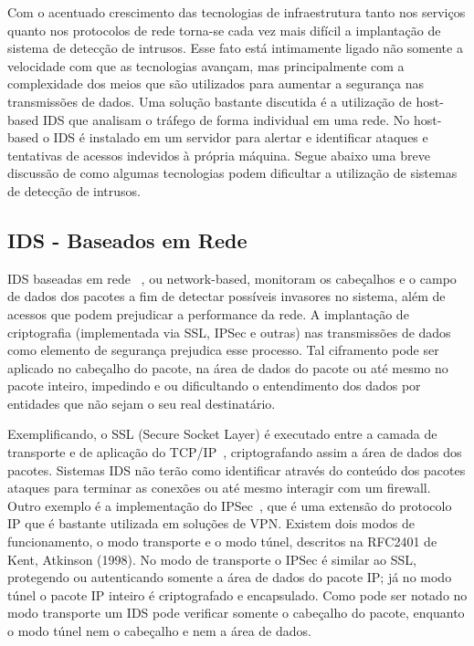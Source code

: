 Com o acentuado crescimento das tecnologias de infraestrutura tanto nos serviços quanto nos protocolos de rede torna-se cada vez mais difícil a implantação de sistema de detecção de intrusos. Esse fato está intimamente ligado não somente a velocidade com que as tecnologias avançam, mas principalmente com a complexidade dos meios que são utilizados para aumentar a segurança nas transmissões de dados.
Uma solução bastante discutida é a utilização de host-based IDS que analisam o tráfego de forma individual em uma rede. No host-based o IDS é instalado em um servidor para alertar e identificar ataques e tentativas de acessos indevidos à própria máquina.
Segue abaixo uma breve discussão de como algumas tecnologias podem dificultar a utilização de sistemas de detecção de intrusos.

\subsection{IDS - Baseados em Rede}
IDS baseadas em rede ~\cite{tanenbaum}, ou network-based, monitoram os cabeçalhos e o campo de dados dos pacotes a fim de detectar possíveis invasores no sistema, além de acessos que podem prejudicar a performance da rede. A implantação de criptografia (implementada via SSL, IPSec e outras) nas transmissões de dados como elemento de segurança prejudica esse processo. Tal ciframento pode ser aplicado no cabeçalho do pacote, na área de dados do pacote ou até mesmo no pacote inteiro, impedindo e ou dificultando o entendimento dos dados por entidades que não sejam o seu real destinatário.

Exemplificando, o SSL (Secure Socket Layer) é executado entre a camada de transporte e de aplicação do TCP/IP~\cite{carmona}, criptografando assim a área de dados dos pacotes. Sistemas IDS não terão como identificar através do conteúdo dos pacotes ataques para terminar as conexões ou até mesmo interagir com um firewall.
Outro exemplo é a implementação do IPSec~\cite{eriberto}, que é uma extensão do protocolo IP que é bastante utilizada em soluções de VPN. Existem dois modos de funcionamento, o modo transporte e o modo túnel, descritos na RFC2401 de Kent, Atkinson (1998).
No modo de transporte o IPSec é similar ao SSL, protegendo ou autenticando somente a área de dados do pacote IP; já no modo túnel o pacote IP inteiro é criptografado e encapsulado. Como pode ser notado no modo transporte um IDS pode verificar somente o cabeçalho do pacote, enquanto o modo túnel nem o cabeçalho e nem a área de dados.

